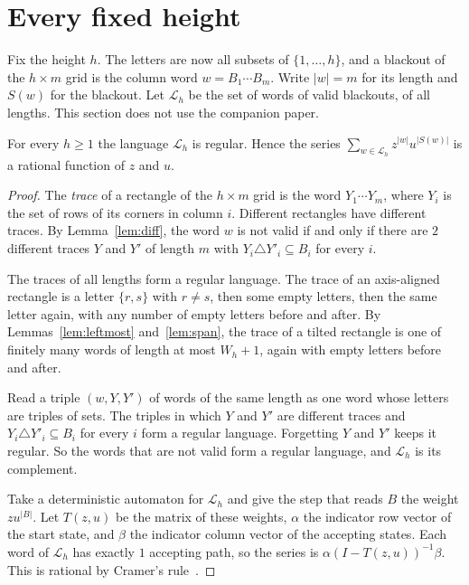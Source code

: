 \section{Every fixed height}\label{sec:height}

Fix the height $h$. The letters are now all subsets of $\{1,\dots,h\}$, and a
blackout of the $h\times m$ grid is the column word $w=B_1\cdots B_m$. Write
$|w|=m$ for its length and $S(w)$ for the blackout. Let $\mathcal L_h$ be the
set of words of valid blackouts, of all lengths. This section does not use the
companion paper.

\begin{theorem}[regularity]\label{thm:regular}
For every $h\ge1$ the language $\mathcal L_h$ is regular. Hence the series
$\sum_{w\in\mathcal L_h}z^{|w|}u^{|S(w)|}$ is a rational function of $z$ and $u$.
\end{theorem}

\begin{proof}
The \emph{trace} of a rectangle of the $h\times m$ grid is the word
$Y_1\cdots Y_m$, where $Y_i$ is the set of rows of its corners in column $i$.
Different rectangles have different traces. By Lemma~\ref{lem:diff}, the word
$w$ is not valid if and only if there are $2$ different traces $Y$ and $Y'$ of
length $m$ with $Y_i\triangle Y'_i\subseteq B_i$ for every $i$.

The traces of all lengths form a regular language. The trace of an axis-aligned
rectangle is a letter $\{r,s\}$ with $r\ne s$, then some empty letters, then the
same letter again, with any number of empty letters before and after. By
Lemmas~\ref{lem:leftmost} and~\ref{lem:span}, the trace of a tilted rectangle is
one of finitely many words of length at most $W_h+1$, again with empty letters
before and after.

Read a triple $(w,Y,Y')$ of words of the same length as one word whose letters
are triples of sets. The triples in which $Y$ and $Y'$ are different traces and
$Y_i\triangle Y'_i\subseteq B_i$ for every $i$ form a regular language.
Forgetting $Y$ and $Y'$ keeps it regular. So the words that are not valid form
a regular language, and $\mathcal L_h$ is its complement.

Take a deterministic automaton for $\mathcal L_h$ and give the step that reads
$B$ the weight $zu^{|B|}$. Let $T(z,u)$ be the matrix of these weights, $\alpha$
the indicator row vector of the start state, and $\beta$ the indicator column
vector of the accepting states. Each word of $\mathcal L_h$ has exactly $1$
accepting path, so the series is $\alpha(I-T(z,u))^{-1}\beta$. This is rational
by Cramer's rule~\cite[Proposition~V.6]{flajolet2009}.
\end{proof}

